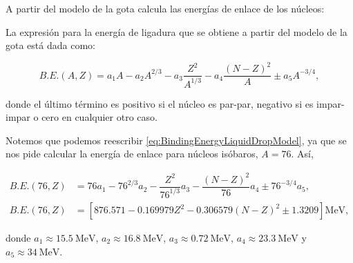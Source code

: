 \documentclass[./../main.tex]{subfiles}
\begin{document}
    \begin{exercise}
        A partir del modelo de la gota calcula las energías de enlace de los núcleos:

        \begin{solution}
            La expresión para la energía de ligadura que se obtiene a partir del modelo de la gota está dada como:

            \begin{equation}
                B.E.(A, Z) = a_{1}A - a_{2}A^{2/3} - a_{3}\dfrac{Z^{2}}{A^{1/3}} - a_{4}\dfrac{(N - Z)^{2}}{A} \pm a_{5}A^{-3/4},
                \label{eq:BindingEnergyLiquidDropModel} 
            \end{equation}

            donde el último término es positivo si el núcleo es par-par, negativo si es impar-impar o cero en cualquier otro caso.

            Notemos que podemos reescribir \cref{eq:BindingEnergyLiquidDropModel}, ya que se nos pide calcular la energía de enlace para núcleos isóbaros, \idest \(A = 76\). Así,

            \begin{align}
                B.E.(76, Z) &= 76a_{1} - 76^{2/3}a_{2} - \dfrac{Z^{2}}{76^{1/3}}a_{3} - \dfrac{(N - Z)^{2}}{76}a_{4} \pm 76^{-3/4}a_{5},\nonumber\\
                B.E.(76, Z) &= \left[\num{876.571} - \num{0.169979}Z^{2} - \num{0.306579}(N - Z)^{2} \pm \num{1.3209}\right]\unit{\MeV},\label{eq:ReducedBindingEnergy}
            \end{align}

            donde \(a_{1} \approx \qty{15.5}{\MeV}\), \(a_{2} \approx \qty{16.8}{\MeV}\), \(a_{3} \approx \qty{0.72}{\MeV}\), \(a_{4} \approx \qty{23.3}{\MeV}\) y \(a_{5} \approx \qty{34}{\MeV}\).


\end{solution}
\end{exercise}
\end{document}
